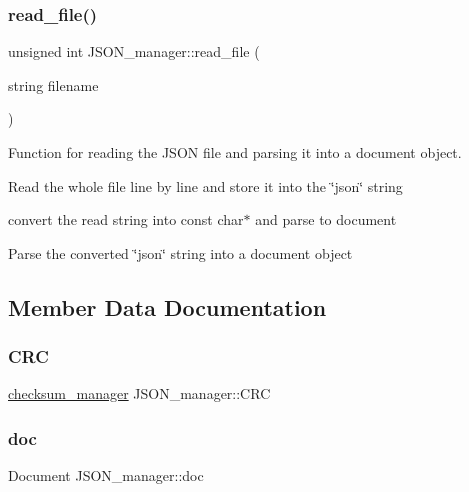 \subsubsection{\texorpdfstring{read\+\_\+file()}{read\_file()}}
{\footnotesize\ttfamily unsigned int J\+S\+O\+N\+\_\+manager\+::read\+\_\+file (\begin{DoxyParamCaption}\item[{string}]{filename }\end{DoxyParamCaption})}



Function for reading the J\+S\+ON file and parsing it into a document object. 

Read the whole file line by line and store it into the \char`\"{}json\char`\"{} string

convert the read string into const char$\ast$ and parse to document

Parse the converted \char`\"{}json\char`\"{} string into a document object 

\subsection{Member Data Documentation}
\mbox{\label{classJSON__manager_aa610a0117c11984a38dcf8ddbe9e985d}} 
\subsubsection{\texorpdfstring{C\+RC}{CRC}}
{\footnotesize\ttfamily \hyperlink{classchecksum__manager}{checksum\+\_\+manager} J\+S\+O\+N\+\_\+manager\+::\+C\+RC\hspace{0.3cm}{\ttfamily [private]}}

\mbox{\label{classJSON__manager_afa1c5569b74bd68fe785d553c798c4dd}} 
\subsubsection{\texorpdfstring{doc}{doc}}
{\footnotesize\ttfamily Document J\+S\+O\+N\+\_\+manager\+::doc\hspace{0.3cm}{\ttfamily [private]}}

